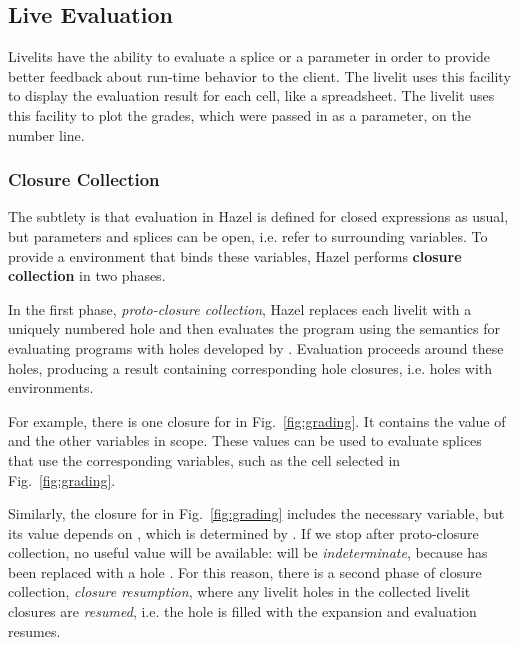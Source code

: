 \subsection{Live Evaluation}\label{sec:live-evaluation}
Livelits have the ability to evaluate a splice or a parameter
in order to provide better feedback about run-time behavior to the client.
The  livelit uses this facility to display
the evaluation result for each cell, like a spreadsheet.
The  livelit uses this facility to plot the grades, which were
passed in as a parameter, on the number line.

\subsubsection{Closure Collection}\label{sec:closure-collection-example} The subtlety is that 
evaluation in Hazel is defined for closed expressions as usual,
but parameters and splices can be open, i.e. refer to surrounding variables.
To provide a environment that binds these variables,
Hazel performs \textbf{closure collection} in two phases.

In the first phase, \emph{proto-closure collection},
Hazel replaces each livelit with a uniquely numbered hole and then evaluates the program
using the semantics for evaluating programs with holes developed by \citet{HazelnutLive}.
Evaluation proceeds around these holes, producing a result containing
corresponding hole closures, i.e. holes with environments.

For example, there is one closure for  in Fig.~\ref{fig:grading}.
It contains the value of  and the other variables in scope.
These values can be used to evaluate
splices that use the corresponding variables, such as the cell selected in Fig.~\ref{fig:grading}.

Similarly, the closure for  in Fig.~\ref{fig:grading} includes
the necessary  variable, but
its value depends on , which is determined by .
If we stop after proto-closure collection,
no useful value will be available:
 will be \emph{indeterminate}, because  has been replaced with a hole \cite{HazelnutLive}.
For this reason, there is a second phase of closure collection, \emph{closure resumption},
where any livelit holes
in the collected livelit closures are \emph{resumed}, i.e. the hole is filled with the expansion
 and evaluation resumes.

